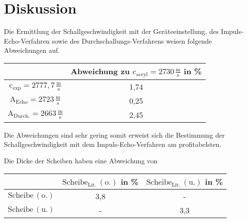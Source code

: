 \section{Diskussion}

\begin{flushleft}
    Die Ermittlung der Schallgeschwindigkeit mit der Geräteeinstellung, des Impuls-Echo-Verfahren sowie des Durchschallungs-Verfahrens weisen folgende Abweichungen auf.
\end{flushleft}

\begin{table}[H]
    \centering
    \begin{tabular} {c | c}
        \toprule
        { } &
        {Abweichung zu $ \text{c}_{\text{acryl}} = 2730\,\frac{\unit{\meter}}{\unit{\second}} $ \cite{a1} in \%} \\
        \midrule
        $\text{c}_{\text{exp}}   = 2777,7\,\frac{\unit{\meter}}{\unit{\second}} $ & 1,74 \\
        $ \text{A}_{\text{Echo}}   = 2723\,\frac{\unit{\meter}}{\unit{\second}} $ & 0,25 \\
        $ \text{A}_{\text{Durch.}} = 2663\,\frac{\unit{\meter}}{\unit{\second}} $ & 2,45 \\
        \bottomrule
    \end{tabular} 
\end{table}

\begin{flushleft}
    Die Abweichungen sind sehr gering somit erweist sich die Bestimmung der Schallgeschwindigkeit mit dem Impuls-Echo-Verfahren am profitabelsten.
\end{flushleft}

\begin{flushleft}
    Die Dicke der Scheiben haben eine Abweichung von
\end{flushleft}

\begin{table}[H]
    \centering
    \begin{tabular} {c |  c  c}
        \toprule
        { } &
        {$ \text{Scheibe}_{\text{Lit.}}\,(\text{o.})$ in \% }  &
        {$ \text{Scheibe}_{\text{Lit.}}\,(\text{u.}) $ in \%}  \\
        \midrule
        $\text{Scheibe}\,(\text{o.}) $ & 3,8 & - \\
        $\text{Scheibe}\,(\text{u.}) $  & -  & 3,3  \\
        \bottomrule
    \end{tabular} 
\end{table}

